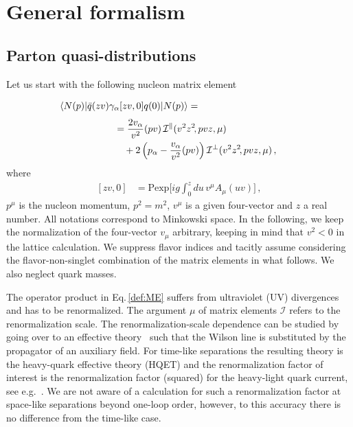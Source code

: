 \section{General formalism}\label{sect_formalism}%
%

%
\subsection{Parton quasi-distributions}\label{subsect_definitions}%
%
Let us start with the following nucleon matrix element
\begin{align}
\label{def:ME}
 &\langle N(p)| \bar q (zv) \gamma_\alpha[zv,0] q(0) |N(p)\rangle  = 
\phantom{\frac{2v_\alpha}{v^2} (pv) \mathcal{I}^\parallel (v^2z^2\!,pvz,\mu)}
\notag\\
&\hspace*{2.0cm} = \frac{2v_\alpha}{v^2} (pv)\, \mathcal{I}^\parallel (v^2z^2\!,pvz,\mu)
\notag\\
&\hspace*{2.0cm}\quad+ 2\left(p_\alpha- \frac{v_\alpha}{v^2} (pv) \right) \mathcal{I}^\perp (v^2z^2\!,pvz,\mu)\,,
\end{align}
where
\begin{align}
\label{def:Wilson}
 [zv, 0] &= \text{Pexp}\Big[i g \int_0^z du\,  v^\mu A_\mu(uv)\Big]\,,
\end{align}
$p^\mu$ is the nucleon momentum, $p^2 = m^2$, $v^\mu$ is a given four-vector and $z$ a real number. All notations correspond to Minkowski space. In the following, we keep the normalization of the four-vector $v_\mu$ arbitrary, keeping in mind that $v^2 <0$ in the lattice calculation. We suppress flavor indices and tacitly assume considering the flavor-non-singlet combination of the matrix elements in what follows. We also neglect quark masses. 

The operator product in Eq.\,\eqref{def:ME} suffers from ultraviolet (UV) divergences and has to be renormalized. The argument $\mu$ of matrix elements $\mathcal{I}$ refers to the renormalization scale. The renormalization-scale dependence can be studied by going over to an effective theory~\cite{Craigie:1980qs,Dorn:1986dt,Ji:2017oey} such that the Wilson line is substituted by the propagator of an auxiliary field. For time-like separations the resulting theory is  the heavy-quark effective theory (HQET) and the renormalization factor of interest is the renormalization factor (squared) for the heavy-light quark current, see e.g.~\cite{Chetyrkin:2003vi}. We are not aware of a calculation for such a renormalization factor at space-like separations beyond one-loop order, however, to this accuracy there is no difference from the time-like case. 


